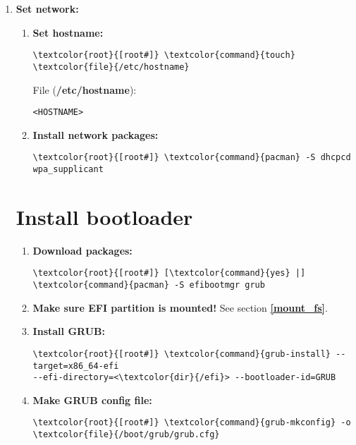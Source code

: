 \documentclass[10pt, a4paper, onecolumn, openany]{book} %
\begin{document}
\begin{enumerate}
        \item \textbf{Set network:}
        \begin{enumerate}
            \item \textbf{Set hostname:}
\begin{Verbatim}[commandchars=\\\{\}]
\textcolor{root}{[root#]} \textcolor{command}{touch} \textcolor{file}{/etc/hostname}
\end{Verbatim}    
File (\textbf{\textcolor{file}{/etc/hostname}}):
\begin{Verbatim}[commandchars=\\\{\}]
<HOSTNAME>
\end{Verbatim}
            \item \textbf{Install network packages:}
\begin{Verbatim}[commandchars=\\\{\}]
\textcolor{root}{[root#]} \textcolor{command}{pacman} -S dhcpcd wpa_supplicant
\end{Verbatim}   
        \end{enumerate}
\section{Install bootloader}
\begin{enumerate}
    \item \textbf{Download packages:}
\begin{Verbatim}[commandchars=\\\{\}]
\textcolor{root}{[root#]} [\textcolor{command}{yes} |] \textcolor{command}{pacman} -S efibootmgr grub
\end{Verbatim}
    \item \textbf{Make sure EFI partition is mounted!}
\newline See section \underline{\textbf{\ref{mount_fs}}}.
    \item \textbf{Install GRUB:}
\begin{Verbatim}[commandchars=\\\{\}]
\textcolor{root}{[root#]} \textcolor{command}{grub-install} --target=x86_64-efi
--efi-directory=<\textcolor{dir}{/efi}> --bootloader-id=GRUB
\end{Verbatim}
    \item \textbf{Make GRUB config file:}
\begin{Verbatim}[commandchars=\\\{\}]
\textcolor{root}{[root#]} \textcolor{command}{grub-mkconfig} -o \textcolor{file}{/boot/grub/grub.cfg}
\end{Verbatim}
\end{enumerate}

\end{enumerate}
\end{document}

